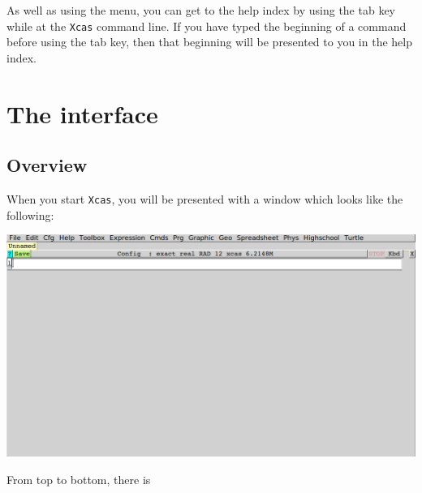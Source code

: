 \documentclass{article}
\begin{document}
As well as using the menu, you can get to the help index by using the
tab key while at the \texttt{Xcas} command line.  If you have typed
the beginning of a command before using the tab key, then that
beginning will be presented to you in the help index.

\section{The interface}

\subsection{Overview}

When you start \texttt{Xcas}, you will be presented with a window which
looks like the following:
\begin{center}
\includegraphics[width=\textwidth]{xcas-open.png}
\end{center}
From top to bottom, there is
\end{document}
